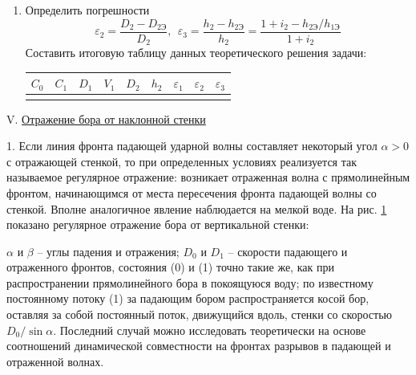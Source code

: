 \documentclass[specialist, subf, href, colorlinks=true, 14pt, final]{disser}
\theoremstyle{definition}
\begin{document}
\begin{enumerate}
  \item Определить погрешности
  \[
    \varepsilon_{2} = \frac{D_{2} - D_{2\text{Э}}}{D_2},\ \  \varepsilon_{3} = \frac{h_{2} - h_{2\text{Э}}}{h_2} = \frac{1 + i_{2} - h_{2\text{Э}}/h_{1\text{Э}}}{1 + i_{2}}
  \]
  Составить итоговую таблицу данных теоретического решения задачи:
  \begin{center}
  \begin{tabular}{|c|c|c|c|c|c|c|c|c|}
  \hline
  $C_0$ & $C_1$ & $D_1$ & $V_1$ & $D_2$ & $h_2$ & $\varepsilon_1$ & $\varepsilon_2$ & $\varepsilon_3$\\
  \hline
  & & & & & & & & \\
  \hline
  \end{tabular}
  \end{center}
\end{enumerate}

\noindent V. \underline{Отражение бора от наклонной стенки}

1. Если линия фронта падающей ударной волны составляет некоторый угол $\alpha > 0$ с отражающей стенкой, то при определенных условиях реализуется так называемое регулярное отражение: возникает отраженная волна с прямолинейным фронтом, начинающимся от места пересечения фронта падающей волны со стенкой. Вполне аналогичное явление наблюдается на мелкой воде. На рис. \ref{1-4-7} показано регулярное отражение бора от вертикальной стенки:
\begin{figure}[!htp]
  \caption{}
  \label{1-4-7}
\end{figure}
$\alpha$ и $\beta$ -- углы падения и отражения; $D_0$ и $D_1$ -- скорости падающего и отраженного фронтов, состояния (0) и (1) точно такие же, как при распространении прямолинейного бора в покоящуюся воду; по известному постоянному потоку (1) за падающим бором  распространяется косой бор, оставляя за собой постоянный поток, движущийся вдоль, стенки со скоростью $D_{0}/\sin\alpha$. Последний случай можно исследовать теоретически на основе соотношений динамической совместности на фронтах разрывов в падающей и отраженной волнах.
\end{document}
